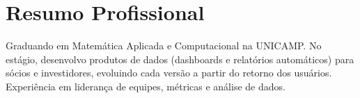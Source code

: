 \renewcommand{\myTitle}{Product Manager \, $|$ \, Product Owner \, $|$ \, Dados}
\resumeheader

\section{Resumo Profissional}
\resumeSubHeadingListStart
    \item \small{Graduando em Matemática Aplicada e Computacional na UNICAMP. No estágio, desenvolvo produtos de dados (dashboards e relatórios automáticos) para sócios e investidores, evoluindo cada versão a partir do retorno dos usuários. Experiência em liderança de equipes, métricas e análise de dados.}
\resumeSubHeadingListEnd

